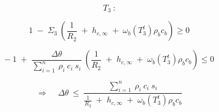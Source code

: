 \begin{adjustwidth}{0cm}{0cm}
	\begin{multicols}{3} %
		
		
		\hspace{-3cm}
		\begin{minipage}{\columnwidth}	
			\vspace{1cm}
			$$T_3 \: \mbox{:}$$ 
		\end{minipage}
		
		\columnbreak %
		
		
		\hspace{-5.5cm}
		\begin{minipage}{\columnwidth}	
			$$
			1 \;-\; \Sigma_3 \: \left(\frac{1}{R_2} \;+\; h_{c, \infty} \;+\; \omega_b (T_3^t) \rho_b c_b \right) \geq 0
			$$
			
			\vspace{-1cm}
			
			$$
			- \: 1 \;+\; \frac{\Delta \theta}{\sum_{i=1}^n \: \rho_i \: c_i \: s_i} \: \left(\frac{1}{R_2} \;+\; h_{c, \infty} \;+\; \omega_b (T_3^t) \rho_b c_b \right) \leq 0
			$$
			
			
		\end{minipage}
		
		\columnbreak
		
		\hspace{-1.5cm}
		\begin{minipage}{1.3\columnwidth}
			\vspace{0.7cm}
			$$
			\Rightarrow \;\;\;\; \Delta \theta \:\leq\: \frac{\sum_{i=1}^n \: \rho_i \: c_i \: s_i}{\frac{1}{R_2} \;+\; h_{c, \infty} \;+\; \omega_b (T_3^t) \rho_b c_b}
			$$
		\end{minipage}
		
	\end{multicols}
\end{adjustwidth}

\newpage

